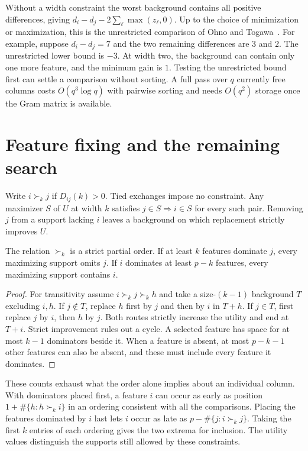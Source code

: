 Without a width constraint the worst background contains all positive
differences, giving $d_i-d_j-2\sum_\ell\max(z_\ell,0)$. Up to the choice
of minimization or maximization, this is the unrestricted comparison of
Ohno and Togawa~\cite[Eq.~19]{ohno2025posets}. For example, suppose
$d_i-d_j=7$ and the two remaining differences are $3$ and $2$. The
unrestricted lower bound is $-3$. At width two, the background can contain
only one more feature, and the minimum gain is $1$. Testing the unrestricted
bound first can settle a comparison without sorting. A full pass over $q$
currently free columns costs $O(q^3\log q)$ with pairwise sorting and needs
$O(q^2)$ storage once the Gram matrix is available.

\section{Feature fixing and the remaining search}
Write $i\succ_k j$ if $D_{ij}(k)>0$. Tied exchanges impose no constraint.
Any maximizer $S$ of $U$ at width $k$ satisfies $j\in S\Rightarrow i\in S$
for every such pair. Removing $j$ from a support lacking $i$ leaves a
background on which replacement strictly improves $U$.

\begin{proposition}
The relation $\succ_k$ is a strict partial order. If at least $k$ features
dominate $j$, every maximizing support omits $j$. If $i$ dominates at least
$p-k$ features, every maximizing support contains $i$.
\end{proposition}
\begin{proof}
For transitivity assume $i\succ_k j\succ_k h$ and take a size-$(k-1)$
background $T$ excluding $i,h$. If $j\notin T$, replace $h$ first by $j$
and then by $i$ in $T+h$. If $j\in T$, first replace $j$ by $i$, then $h$
by $j$. Both routes strictly increase the utility and end at $T+i$.
Strict improvement rules out a cycle. A selected feature has space for at
most $k-1$ dominators beside it. When a feature is absent, at most
$p-k-1$ other features can also be absent, and these must include every
feature it dominates.
\end{proof}

These counts exhaust what the order alone implies about an individual
column. With dominators placed first, a feature $i$ can occur as early as
position $1+\#\{h:h\succ_k i\}$ in an ordering consistent with all the
comparisons. Placing the features dominated by $i$ last lets $i$ occur as
late as $p-\#\{j:i\succ_k j\}$. Taking the first $k$ entries of each
ordering gives the two extrema for inclusion. The utility values distinguish
the supports still allowed by these constraints.

